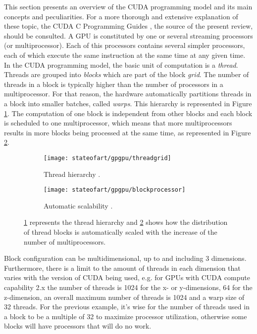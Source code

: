 This section presents an overview of the CUDA programming model and its main concepts and peculiarities.
For a more thorough and extensive explanation of these topic, the CUDA C Programming Guides \cite{Nvidia2014}, the source of the present review, should be consulted.
A GPU is constituted by one or several streaming processors (or multiprocessor).
Each of this processors contains several simpler processors, each of which execute the same instruction at the same time at any given time.
In the CUDA programming model, the basic unit of computation is a \emph{thread}.
Threads are grouped into \emph{blocks} which are part of the block \emph{grid}.
The number of threads in a block is typically higher than the number of processors in a multiprocessor.
For that reason, the hardware automatically partitions threads in a block into smaller batches, called \emph{warps}.
This hierarchy is represented in Figure \ref{fig:gridthread}.
The computation of one block is independent from other blocks and each block is scheduled to one multiprocessor, which means that more multiprocessors results in more blocks being processed at the same time, as represented in Figure \ref{fig:blockprocessor}.


\begin{figure}[!ht]
    \centering
    \begin{subfigure}[b]{0.45\textwidth}
        \centering
        \texttt{[image: stateofart/gpgpu/threadgrid]}
        \caption{Thread hierarchy \cite{Nvidia2014}.}
        \label{fig:gridthread}
    \end{subfigure}
    \hfill
    \begin{subfigure}[b]{0.45\textwidth}
        \centering
        \texttt{[image: stateofart/gpgpu/blockprocessor]}
        \caption{Automatic scalability \cite{Nvidia2014}.}
        \label{fig:blockprocessor}
    \end{subfigure}
    \caption{\ref{fig:gridthread} represents the thread hierarchy and \ref{fig:blockprocessor} shows how the distribution of thread blocks is automatically scaled with the increase of the number of multiprocessors.}
    \label{fig:cuda fig1}
\end{figure}

Block configuration can be multidimensional, up to and including 3 dimensions.
Furthermore, there is a limit to the amount of threads in each dimension that varies with the version of CUDA being used, e.g. for GPUs with CUDA compute capability 2.x  the number of threads is 1024 for the x- or y-dimensions, 64 for the z-dimension, an overall maximum number of threads is 1024 and a warp size of 32 threads.
For the previous example, it's wise for the number of threads used in a block to be a multiple of 32 to maximize processor utilization, otherwise some blocks will have processors that will do no work.

